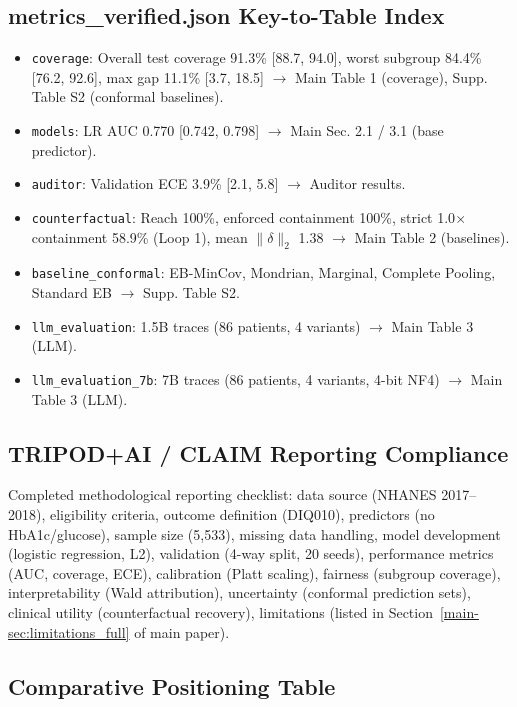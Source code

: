 \documentclass[11pt,a4paper]{article}
\theoremstyle{plain}
\begin{document}
\subsection{metrics\_verified.json Key-to-Table Index}

\begin{itemize}
\item \texttt{coverage}: Overall test coverage 91.3\% [88.7, 94.0], worst subgroup 84.4\% [76.2, 92.6], max gap 11.1\% [3.7, 18.5] $\to$ Main Table 1 (coverage), Supp. Table S2 (conformal baselines).
\item \texttt{models}: LR AUC 0.770 [0.742, 0.798] $\to$ Main Sec. 2.1 / 3.1 (base predictor).
\item \texttt{auditor}: Validation ECE 3.9\% [2.1, 5.8] $\to$ Auditor results.
\item \texttt{counterfactual}: Reach 100\%, enforced containment 100\%, strict 1.0$\times$ containment 58.9\% (Loop 1), mean $\|\delta\|_2$ 1.38 $\to$ Main Table 2 (baselines).
\item \texttt{baseline\_conformal}: EB-MinCov, Mondrian, Marginal, Complete Pooling, Standard EB $\to$ Supp. Table S2.
\item \texttt{llm\_evaluation}: 1.5B traces (86 patients, 4 variants) $\to$ Main Table 3 (LLM).
\item \texttt{llm\_evaluation\_7b}: 7B traces (86 patients, 4 variants, 4-bit NF4) $\to$ Main Table 3 (LLM).
\end{itemize}

\subsection{TRIPOD+AI / CLAIM Reporting Compliance}

Completed methodological reporting checklist: data source (NHANES 2017--2018), eligibility criteria, outcome definition (DIQ010), predictors (no HbA1c/glucose), sample size (5,533), missing data handling, model development (logistic regression, L2), validation (4-way split, 20 seeds), performance metrics (AUC, coverage, ECE), calibration (Platt scaling), fairness (subgroup coverage), interpretability (Wald attribution), uncertainty (conformal prediction sets), clinical utility (counterfactual recovery), limitations (listed in Section~\ref{main-sec:limitations_full} of main paper).

\subsection{Comparative Positioning Table}
\end{document}
